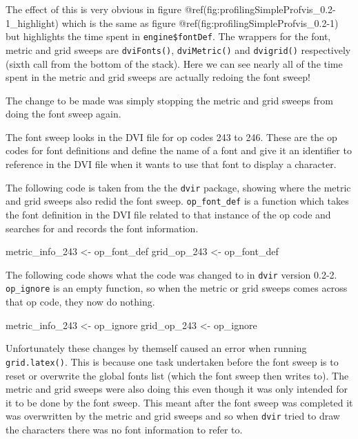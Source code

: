 \documentclass[]{article}
\newenvironment{Shaded}{\begin{snugshade}}{\end{snugshade}}
\newcommand{\DecValTok}[1]{\textcolor[rgb]{0.00,0.00,0.81}{#1}}
\newcommand{\StringTok}[1]{\textcolor[rgb]{0.31,0.60,0.02}{#1}}
\newcommand{\NormalTok}[1]{#1}
\begin{document}
The effect of this is very obvious in figure
@ref(fig:profilingSimpleProfvis\_0.2-1\_highlight) which is the same as
figure @ref(fig:profilingSimpleProfvis\_0.2-1) but highlights the time
spent in \texttt{engine\$fontDef}. The wrappers for the font, metric and
grid sweeps are \texttt{dviFonts()}, \texttt{dviMetric()} and
\texttt{dvigrid()} respectively (sixth call from the bottom of the
stack). Here we can see nearly all of the time spent in the metric and
grid sweeps are actually redoing the font sweep!

The change to be made was simply stopping the metric and grid sweeps
from doing the font sweep again.

The font sweep looks in the DVI file for op codes 243 to 246. These are
the op codes for font definitions and define the name of a font and give
it an identifier to reference in the DVI file when it wants to use that
font to display a character.

The following code is taken from the the \texttt{dvir} package, showing
where the metric and grid sweeps also redid the font sweep.
\texttt{op\_font\_def} is a function which takes the font definition in
the DVI file related to that instance of the op code and searches for
and records the font information.

\begin{Shaded}
\begin{Highlighting}[]
\NormalTok{metric_info_}\DecValTok{243}\NormalTok{ <-}\StringTok{ }\NormalTok{op_font_def}
\NormalTok{grid_op_}\DecValTok{243}\NormalTok{ <-}\StringTok{ }\NormalTok{op_font_def}
\end{Highlighting}
\end{Shaded}

The following code shows what the code was changed to in \texttt{dvir}
version 0.2-2. \texttt{op\_ignore} is an empty function, so when the
metric or grid sweeps comes across that op code, they now do nothing.

\begin{Shaded}
\begin{Highlighting}[]
\NormalTok{metric_info_}\DecValTok{243}\NormalTok{ <-}\StringTok{ }\NormalTok{op_ignore}
\NormalTok{grid_op_}\DecValTok{243}\NormalTok{ <-}\StringTok{ }\NormalTok{op_ignore}
\end{Highlighting}
\end{Shaded}

Unfortunately these changes by themself caused an error when running
\texttt{grid.latex()}. This is because one task undertaken before the
font sweep is to reset or overwrite the global fonts list (which the
font sweep then writes to). The metric and grid sweeps were also doing
this even though it was only intended for it to be done by the font
sweep. This meant after the font sweep was completed it was overwritten
by the metric and grid sweeps and so when \texttt{dvir} tried to draw
the characters there was no font information to refer to.
\end{document}
